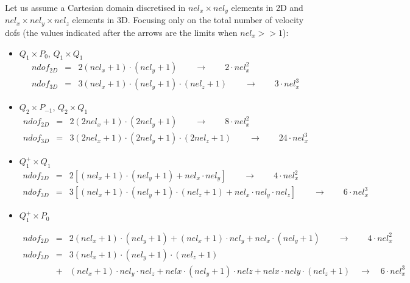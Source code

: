 Let us assume a Cartesian domain discretised in $nel_x \times nel_y$
elements in 2D and $nel_x \times nel_y \times nel_z$ elements in 3D.
Focusing only on the total number of velocity dofs (the values indicated after the 
arrows are the limits when $nel_x >> 1$):

\begin{itemize}

\item $Q_1 \times P_0$, $Q_1 \times Q_1$
\begin{eqnarray}
ndof_{2D}     &=&2 (nel_x+1) \cdot (nel_y+1) 
\qquad \rightarrow \qquad 2 \cdot nel_x^2   \nonumber\\
ndof_{3D}&=&3 (nel_x+1) \cdot (nel_y+1) \cdot (nel_z+1)
\qquad \rightarrow \qquad 3 \cdot nel_x^3 \nonumber
\end{eqnarray}

\item $Q_2 \times P_{-1}$, $Q_2 \times Q_1$
\begin{eqnarray}
ndof_{2D}      &=&2 (2nel_x+1) \cdot (2nel_y+1) 
\qquad \rightarrow \qquad 8 \cdot nel_x^2   \nonumber\\
ndof_{3D}&=&3 (2nel_x+1) \cdot (2nel_y+1) \cdot (2nel_z+1)
\qquad \rightarrow \qquad 24 \cdot nel_x^3 \nonumber
\end{eqnarray}

\item $Q_1^+ \times Q_1$
\begin{eqnarray}
ndof_{2D}  &=&2 [ (nel_x+1) \cdot (nel_y+1) + nel_x \cdot nel_y ]
\qquad \rightarrow \qquad 4 \cdot nel_x^2   \nonumber\\
ndof_{3D}  &=&3 [ (nel_x+1) \cdot (nel_y+1) \cdot (nel_z+1) + nel_x \cdot nel_y \cdot nel_z ]
\qquad \rightarrow \qquad 6 \cdot nel_x^3 \nonumber
\end{eqnarray}

\item $Q_1^+ \times P_0$

\begin{eqnarray}
ndof_{2D}     &=&2 (nel_x+1) \cdot (nel_y+1) + (nel_x+1)\cdot nel_y + nel_x\cdot(nel_y+1)
\qquad \rightarrow \qquad 4 \cdot nel_x^2   \nonumber\\
ndof_{3D}&=&3 (nel_x+1) \cdot (nel_y+1) \cdot (nel_z+1) \nonumber\\
&+&  (nel_x+1)\cdot nel_y \cdot nel_z + nelx\cdot (nel_y+1) \cdot nelz + nelx\cdot nely \cdot (nel_z+1)
\quad \rightarrow \quad 6 \cdot nel_x^3 \nonumber
\end{eqnarray}

\end{itemize}


